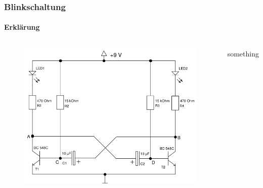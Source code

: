 \begin{frame}
    \frametitle{Blinkschaltung}
    \framesubtitle{Erklärung}
    \begin{columns}[c]
        \begin{figure}[H]
        \begin{center}
                \includegraphics[scale=0.3]{./img/schaltungen/blink.png}
        \end{center}
        \end{figure}
    something
    \end{columns}
\end{frame}


